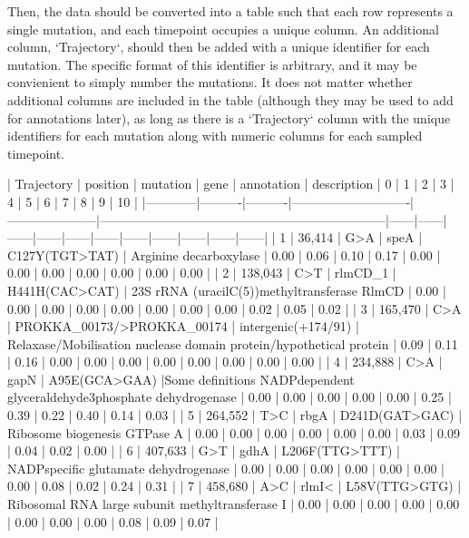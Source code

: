 Then, the data should be converted into a table such that each row represents a single mutation, and each timepoint occupies a unique column. An additional column, `Trajectory`, should then be added with a unique identifier for each mutation. The specific format of this identifier is arbitrary, and it may be convienient to simply number the mutations. It does not matter whether additional columns are included in the table (although they may be used to add for annotations later), as long as there is a `Trajectory` column with the unique identifiers for each mutation along with numeric columns for each sampled timepoint.

| Trajectory | position | mutation | gene                       | annotation          | description                                                        | 0    | 1    | 2    | 3    | 4    | 5    | 6    | 7    | 8    | 9    | 10   |
|------------|----------|----------|----------------------------|---------------------|--------------------------------------------------------------------|------|------|------|------|------|------|------|------|------|------|------|
| 1          | 36,414   | G>A      | speA                       | C127Y(TGT>TAT)      | Arginine decarboxylase                                             | 0.00 | 0.06 | 0.10 | 0.17 | 0.00 | 0.00 | 0.00 | 0.00 | 0.00 | 0.00 | 0.00 |
| 2          | 138,043  | C>T      | rlmCD_1                    | H441H(CAC>CAT)      | 23S rRNA (uracilC(5))methyltransferase RlmCD                       | 0.00 | 0.00 | 0.00 | 0.00 | 0.00 | 0.00 | 0.00 | 0.00 | 0.02 | 0.05 | 0.02 |
| 3          | 165,470  | C>A      | PROKKA_00173/>PROKKA_00174 | intergenic(+174/91) | Relaxase/Mobilisation nuclease domain protein/hypothetical protein | 0.09 | 0.11 | 0.16 | 0.00 | 0.00 | 0.00 | 0.00 | 0.00 | 0.00 | 0.00 | 0.00 |
| 4          | 234,888  | C>A      | gapN                       | A95E(GCA>GAA)       |Some definitions NADPdependent glyceraldehyde3phosphate dehydrogenase               | 0.00 | 0.00 | 0.00 | 0.00 | 0.00 | 0.25 | 0.39 | 0.22 | 0.40 | 0.14 | 0.03 |
| 5          | 264,552  | T>C      | rbgA                       | D241D(GAT>GAC)      | Ribosome biogenesis GTPase A                                       | 0.00 | 0.00 | 0.00 | 0.00 | 0.00 | 0.00 | 0.03 | 0.09 | 0.04 | 0.02 | 0.00 |
| 6          | 407,633  | G>T      | gdhA                       | L206F(TTG>TTT)      | NADPspecific glutamate dehydrogenase                               | 0.00 | 0.00 | 0.00 | 0.00 | 0.00 | 0.00 | 0.00 | 0.08 | 0.02 | 0.24 | 0.31 |
| 7          | 458,680  | A>C      | rlmI<                      | L58V(TTG>GTG)       | Ribosomal RNA large subunit methyltransferase I                    | 0.00 | 0.00 | 0.00 | 0.00 | 0.00 | 0.00 | 0.00 | 0.00 | 0.08 | 0.09 | 0.07 |

